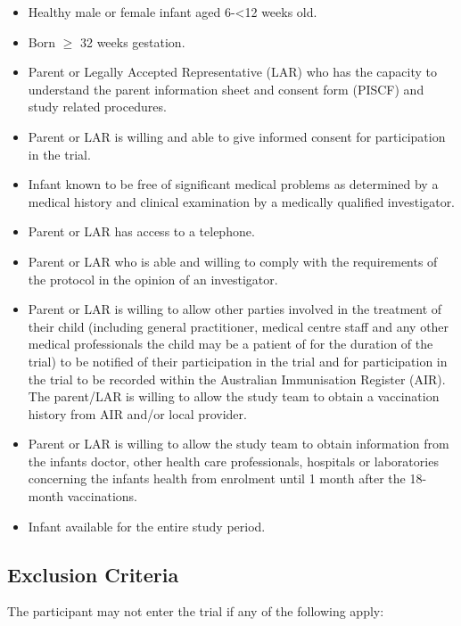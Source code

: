 \documentclass{bmcart}
\begin{document}
\begin{itemize}
	\item Healthy male or female infant aged 6-\textless12 weeks old.
	\item Born $\geq$ 32 weeks gestation.
	\item
	Parent or Legally Accepted Representative (LAR) who has the capacity to understand the parent information sheet and consent form (PISCF) and study related procedures.
	\item Parent or LAR is willing and able to give informed consent for participation in the trial.
	\item Infant known to be free of significant medical problems as determined by a medical history and clinical examination by a medically qualified investigator.
	\item Parent or LAR has access to a telephone.
	\item Parent or LAR who is able and willing to comply with the requirements of the protocol in the opinion of an investigator.
	\item Parent or LAR is willing to allow other parties involved in the treatment of their child (including general practitioner, medical centre staff and any other medical professionals the child may be a patient of for the duration of the trial) to be notified of their participation in the trial and for participation in the trial to be recorded within the Australian Immunisation Register (AIR). The parent/LAR is willing to allow the study team to obtain a vaccination history from AIR and/or local provider.
	\item Parent or LAR is willing to allow the study team to obtain information from the infants doctor, other health care professionals, hospitals or laboratories concerning the infants health from enrolment until 1 month after the 18-month vaccinations.
	\item Infant available for the entire study period.
\end{itemize}


\subsection*{Exclusion Criteria}

The participant may not enter the trial if any of the following apply:
\end{document}
